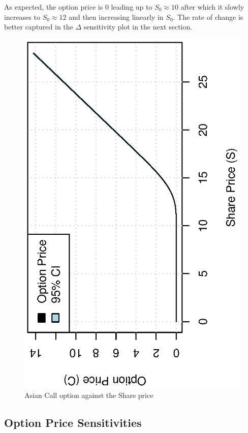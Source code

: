 \documentclass[12pt,a4paper]{article}
\begin{document}
As expected, the option price is $0$ leading up to $S_{0} \approx 10$
after which it slowly increases to $S_{0} \approx 12$ and then
increasing linearly in $S_{0}$. The rate of change is better captured
in the $\Delta$ sensitivity plot  in the
next section.

\begin{figure}[!ht]
  \centering
  \includegraphics[scale=0.85,angle=-90]{./images/pseudo/option_share.eps}
  \caption{Asian Call option against the Share price}
  \label{fig:option-share-price}
\end{figure}

\subsection{Option Price Sensitivities}
\label{sec:opti-price-sens}
\end{document}
